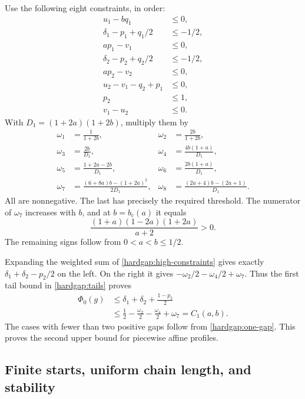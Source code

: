 Use the following eight constraints, in order:
\begin{equation}\label{hardgap:high-constraints}
 \begin{aligned}
 u_1-bq_1&\le0,\\
 \delta_1-p_1+q_1/2&\le-1/2,\\
 ap_1-v_1&\le0,\\
 \delta_2-p_2+q_2/2&\le-1/2,\\
 ap_2-v_2&\le0,\\
 u_2-v_1-q_2+p_1&\le0,\\
 p_2&\le1,\\
 v_1-u_2&\le0.
 \end{aligned}
\end{equation}
With \(D_1=(1+2a)(1+2b)\), multiply them by
\begin{equation}\label{hardgap:high-weights}
 \begin{aligned}
 \omega_1&=\frac1{1+2b},&
 \omega_2&=\frac{2b}{1+2b},\\
 \omega_3&=\frac{2b}{D_1},&
 \omega_4&=\frac{4b(1+a)}{D_1},\\
 \omega_5&=\frac{1+2a-2b}{D_1},&
 \omega_6&=\frac{2b(1+a)}{D_1},\\
 \omega_7&=\frac{(6+8a)b-(1+2a)^2}{2D_1},&
 \omega_8&=\frac{(2a+4)b-(2a+1)}{D_1}.
 \end{aligned}
\end{equation}
All are nonnegative. The last has precisely the required threshold.
The numerator of \(\omega_7\) increases with \(b\), and at
\(b=b_{\mathrm c}(a)\) it equals
\[
 \frac{(1+a)(1-2a)(1+2a)}{a+2}>0.
\]
The remaining signs follow from \(0<a<b\le1/2\).

Expanding the weighted sum of \eqref{hardgap:high-constraints} gives
exactly \(\delta_1+\delta_2-p_2/2\) on the left. On the right it
gives \(-\omega_2/2-\omega_4/2+\omega_7\). Thus the first tail
bound in \eqref{hardgap:tails} proves
\begin{align*}
 \Phi_0(g)
 &\le\delta_1+\delta_2+\frac{1-p_2}{2}\\
 &\le\frac12-\frac{\omega_2}{2}-\frac{\omega_4}{2}+\omega_7
 =C_1(a,b).
\end{align*}
The cases with fewer than two positive gaps follow from
\eqref{hardgap:one-gap}. This proves the second upper bound for piecewise
affine profiles.

\subsection{Finite starts, uniform chain length, and stability}
\label{hardgap:compactness}

